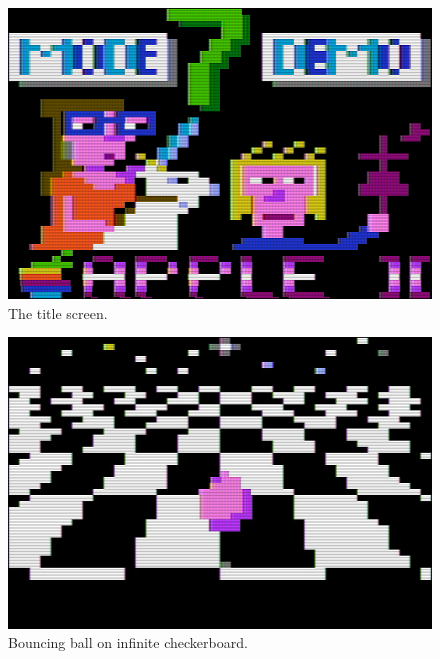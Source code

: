 \documentclass[twocolumn]{article}
\begin{document}
\begin{figure}[tb]
\begin{center}
\includegraphics[width=\columnwidth]{figures/mode7_demo_title.png}
\end{center}
\caption{The title screen.\label{fig:title}}
\end{figure}

\begin{figure}[tb]
\begin{center}
\includegraphics[width=\columnwidth]{figures/m7_screen1.jpg}
\caption{Bouncing ball on infinite checkerboard.\label{fig:ball}}
\end{center}
\end{figure}
\end{document}
